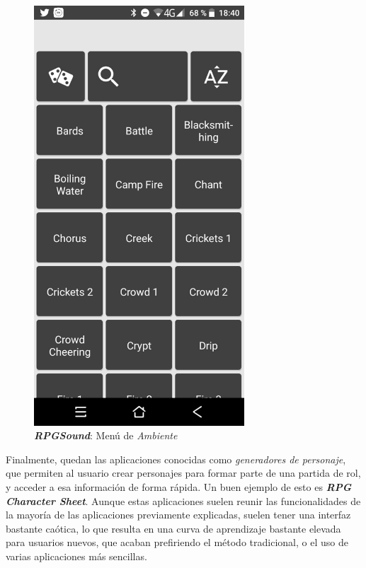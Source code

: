 \begin{figure}[H]
\begin{minipage}{0.3\textwidth}
    \end{minipage} \hspace{2cm}
    \begin{minipage}{0.3\textwidth}
        \centering
        \includegraphics[width=0.7\textwidth]{Images/RPGSound_2.jpeg}
        \caption{\textit{\textbf{RPGSound}}: Menú de \textit{Ambiente}}
        
    \end{minipage}
\end{figure}
\vspace{1cm}

Finalmente, quedan las aplicaciones conocidas como \textit{generadores de
personaje}, que permiten al usuario crear personajes para formar parte de 
una partida de rol, y acceder a esa información de forma rápida. Un buen 
ejemplo de esto es \textit{\textbf{RPG Character Sheet}}. Aunque estas aplicaciones 
suelen reunir las funcionalidades de la mayoría de las aplicaciones previamente 
explicadas, suelen tener una interfaz bastante caótica, lo que resulta en una 
curva de aprendizaje bastante elevada para usuarios nuevos, que acaban 
prefiriendo el método tradicional, o el uso de varias aplicaciones más sencillas.\vspace{1cm}


